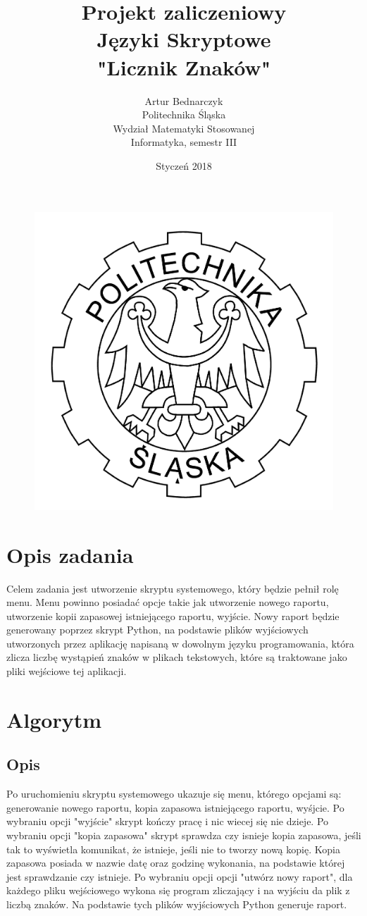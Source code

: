 \documentclass[]{article}
\title{Projekt zaliczeniowy\\Języki Skryptowe\\"Licznik Znaków"}
\author{Artur Bednarczyk\\Politechnika Śląska\\Wydział Matematyki Stosowanej\\Informatyka, semestr III}
\date{Styczeń 2018}
\begin{document}
\maketitle
\begin{figure}[H]
	\centering
	\includegraphics[width=0.5\linewidth]{LOGO}
	\label{fig:logo}
\end{figure}
\clearpage
\tableofcontents
\clearpage

\section{Opis zadania}
Celem zadania jest utworzenie skryptu systemowego, który będzie pełnił rolę menu. Menu powinno posiadać opcje takie jak utworzenie nowego raportu, utworzenie kopii zapasowej istniejącego raportu, wyjście. Nowy raport będzie generowany poprzez skrypt Python, na podstawie plików wyjściowych utworzonych przez aplikację napisaną w dowolnym języku programowania, która zlicza liczbę wystąpień znaków w plikach tekstowych, które są traktowane jako pliki wejściowe tej aplikacji.

\section{Algorytm}
\subsection{Opis}
Po uruchomieniu skryptu systemowego ukazuje się menu, którego opcjami są: generowanie nowego raportu, kopia zapasowa istniejącego raportu, wyśjcie. Po wybraniu opcji "wyjście" skrypt kończy pracę i nic wiecej się nie dzieje. Po wybraniu opcji "kopia zapasowa" skrypt sprawdza czy isnieje kopia zapasowa, jeśli tak to wyświetla komunikat, że istnieje, jeśli nie to tworzy nową kopię. Kopia zapasowa posiada w nazwie datę oraz godzinę wykonania, na podstawie której jest sprawdzanie czy istnieje. Po wybraniu opcji opcji "utwórz nowy raport", dla każdego pliku wejściowego wykona się program zliczający i na wyjściu da plik z liczbą znaków. Na podstawie tych plików wyjściowych Python generuje raport.
\end{document}
